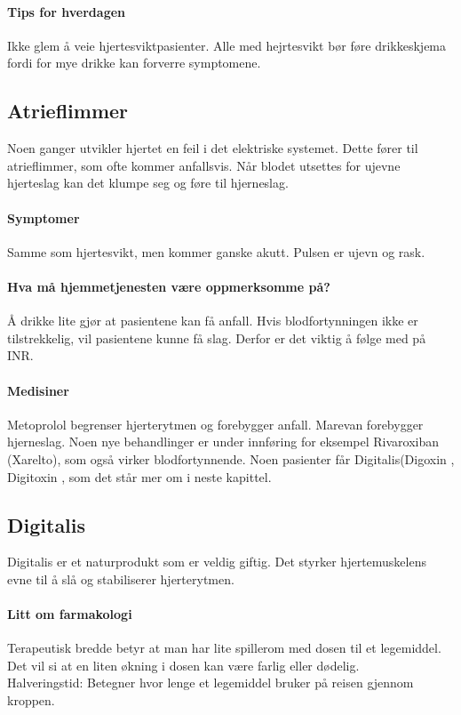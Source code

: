 				\paragraph{Tips for hverdagen\\}
					Ikke glem å veie hjertesviktpasienter. Alle med hejrtesvikt bør føre drikkeskjema fordi for mye drikke kan forverre symptomene. 
			\subsection{Atrieflimmer}
				Noen ganger utvikler hjertet en feil i det elektriske systemet. Dette fører til atrieflimmer, som ofte kommer anfallsvis. Når blodet utsettes for ujevne hjerteslag kan det klumpe seg og føre til hjerneslag.
				\paragraph{Symptomer\\}
					Samme som hjertesvikt, men kommer ganske akutt. Pulsen er ujevn og rask. 
				\paragraph{Hva må hjemmetjenesten være oppmerksomme på?\\}
					Å drikke lite gjør at pasientene kan få anfall. Hvis blodfortynningen ikke er tilstrekkelig, vil pasientene kunne få slag. Derfor er det viktig å følge med på INR. 
				\paragraph{Medisiner\\}
					Metoprolol begrenser hjerterytmen og forebygger anfall. Marevan forebygger hjerneslag. Noen nye behandlinger er under innføring for eksempel Rivaroxiban (Xarelto\textregistered), som også virker blodfortynnende. Noen pasienter får Digitalis(Digoxin \textregistered, Digitoxin \textregistered, som det står mer om i neste kapittel.
			\subsection{Digitalis}
				Digitalis er et naturprodukt som er veldig giftig. Det styrker hjertemuskelens evne til å slå og stabiliserer hjerterytmen.
				\paragraph{Litt om farmakologi\\}
					Terapeutisk bredde betyr at man har lite spillerom med dosen til et legemiddel. Det vil si at en liten økning i dosen kan være farlig eller dødelig. \\
					Halveringstid: Betegner hvor lenge et legemiddel bruker på reisen gjennom kroppen.\\
